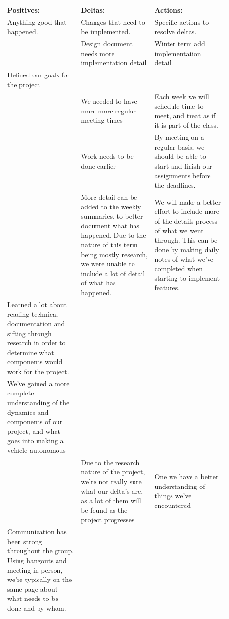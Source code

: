 \documentclass[compsoc,draftclsnofoot,onecolumn,10pt]{IEEEtran}
\begin{document}
	\begin{center}
		\begin{tabular}{|p{0.3\linewidth}|p{0.3\linewidth}|p{0.3\linewidth}|}
			\hline
			\textbf{Positives:} & \textbf{Deltas:} & \textbf{Actions:}\\
			
            		Anything good that happened. & Changes that need to be implemented. & Specific actions to resolve deltas.\\
			\hline

			 & Design document needs more implementation detail & Winter term add implementation detail.\\
			\hline
			Defined our goals for the project & & \\
			\hline
			 & We needed to have more more regular meeting times & Each week we will schedule time to meet, and treat as if it is part of the class.\\
			\hline
			 & Work needs to be done earlier & By meeting on a regular basis, we should be able to start and finish our assignments before the deadlines.\\
			\hline
			 & More detail can be added to the weekly summaries, to better document what has happened. Due to the nature of this term being mostly research, we were unable to include a lot of detail of what has happened. & We will make a better effort to include more of the details process of what we went through. This can be done by making daily notes of what we've completed when starting to implement features. \\
			\hline
			Learned a lot about reading technical documentation and sifting through research in order to determine what components would work for the project. & & \\
			\hline
			We've gained a more complete understanding of the dynamics and components of our project, and what goes into making a vehicle autonomous & & \\
			\hline
			 & Due to the research nature of the project, we're not really sure what our delta's are, as a lot of them will be found as the project progresses & One we have a better understanding of things we've encountered\\
			\hline
			Communication has been strong throughout the group. Using hangouts and meeting in person, we're typically on the same page about what needs to be done and by whom. & & \\
			\hline
			
		\end{tabular}
	\end{center}
\end{document}
